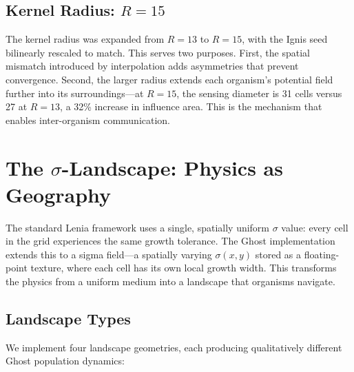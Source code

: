 \documentclass[11pt,a4paper]{article}
\begin{document}
\subsection{Kernel Radius: $R = 15$}

The kernel radius was expanded from $R = 13$ to $R = 15$, with the Ignis
seed bilinearly rescaled to match. This serves two purposes. First, the
spatial mismatch introduced by interpolation adds asymmetries that prevent
convergence. Second, the larger radius extends each organism's potential
field further into its surroundings---at $R = 15$, the sensing diameter is
31 cells versus 27 at $R = 13$, a 32\% increase in influence area. This is
the mechanism that enables inter-organism communication.

\section{The $\sigma$-Landscape: Physics as Geography}

The standard Lenia framework uses a single, spatially uniform $\sigma$
value: every cell in the grid experiences the same growth tolerance. The
Ghost implementation extends this to a sigma field---a spatially varying
$\sigma(x,y)$ stored as a floating-point texture, where each cell has its
own local growth width. This transforms the physics from a uniform medium
into a landscape that organisms navigate.

\subsection{Landscape Types}

We implement four landscape geometries, each producing qualitatively
different Ghost population dynamics:
\end{document}
